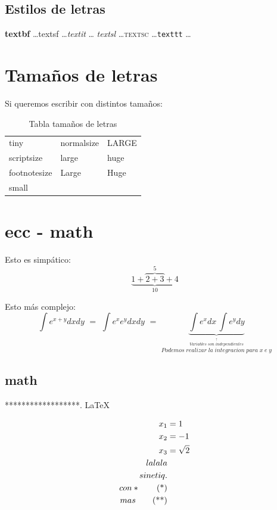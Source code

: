 \subsection{Estilos de letras}
\textbf{textbf} \dots \textsf{textsf} \dots \textit{textit} \dots
\textsl{textsl} \dots \textsc{textsc} \dots \texttt{texttt} \dots

\section{Tamaños de letras}
Si queremos escribir con distintos tamaños:
\begin{table}[htbp]
  \centering
  \begin{tabular}{lll}
    \tiny{tiny} & \normalsize{normalsize} & \LARGE{LARGE} \\
    \scriptsize{scriptsize} & \large{large} & \huge{huge} \\
    \footnotesize{footnotesize} & \Large{Large} & \Huge{Huge}\\
    \small{small}
  \end{tabular}
  \caption{Tabla tamaños de letras}
\end{table}

\section{ecc - math}

Esto es simpático:
\[ \underbrace{1 + \overbrace{2 + 3}^{5} + 4}_{10} \]

Esto más complejo:
\begin{displaymath}
  \int e^{x+y}dx dy \,\, = \,\,
  \int e^x e^y dxdy \,\, = \,\,
  \underbrace{\int e^x dx \, \int e^y dy}_{\stackrel{\stackrel{\uparrow}{Variables \; son \;independientes}}{Podemos \;realizar\; la\; integracion\; para\; x\; e\; y}}
\end{displaymath}





\subsection{math}
******************. \LaTeX{}

\begin{align}
x_1 &= 1 \\
x_2 &= -1 \\
x_3 &= \sqrt{2} \\
lalala  \notag \\
sin etiq.  \notag \\
con *  \tag{*} \\
mas  \tag{**}
\end{align}

